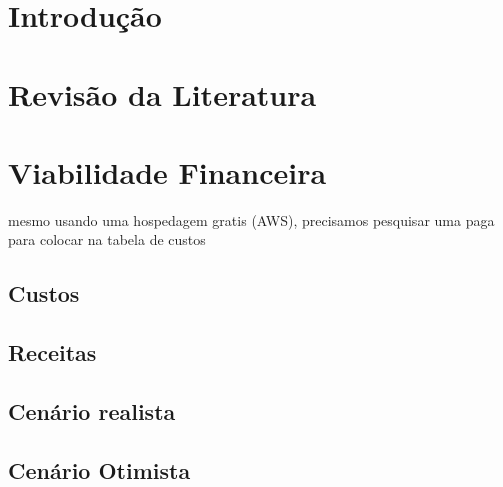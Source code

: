 \documentclass[
12pt,				%
openany,			%
oneside,			%
a4paper,			%
english,			%
french,				%
spanish,			%
brazil				%
]{abntex2}
\begin{document}
	\textual
	
	\chapter{Introdução}
		


	
	\chapter{Revisão da Literatura}
	
	
		
	
	
	
	
	
	
	
	\chapter{Viabilidade Financeira}
	
	mesmo usando uma hospedagem gratis (AWS), precisamos pesquisar uma paga para colocar na tabela de custos
	
	\section{Custos}
	
	\section{Receitas}
	\section{Cenário realista}
	\section{Cenário Otimista}
\end{document}
